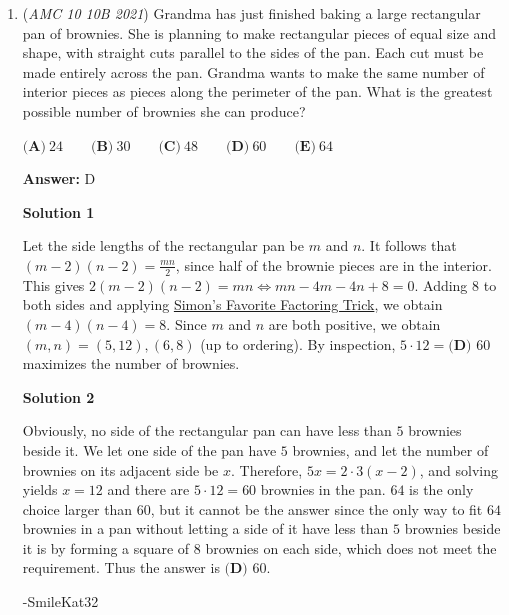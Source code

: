 \begin{enumerate}
 Therefore, the height is divided by $3$ and divided by $4$, which is $18 \div 3 \div 4 = \boxed{\textbf{(A)} ~1.5}.$



	\item (\textit{AMC 10 10B 2021}) Grandma has just finished baking a large rectangular pan of brownies. She is planning to make rectangular pieces of equal size and shape, with straight cuts parallel to the sides of the pan. Each cut must be made entirely across the pan. Grandma wants to make the same number of interior pieces as pieces along the perimeter of the pan. What is the greatest possible number of brownies she can produce?


 $\textbf{(A)} ~24 \qquad\textbf{(B)} ~30 \qquad\textbf{(C)} ~48 \qquad\textbf{(D)} ~60 \qquad\textbf{(E)} ~64$

 \textbf{Answer: }D



\textbf{Solution 1}

Let the side lengths of the rectangular pan be $m$ and $n$. It follows that $(m-2)(n-2) = \frac{mn}{2}$, since half of the brownie pieces are in the interior. This gives $2(m-2)(n-2) = mn \iff mn - 4m - 4n + 8 = 0$. Adding $8$ to both sides and applying \href{https://artofproblemsolving.com/wiki/index.php?title=Simon\%27s\_Favorite\_Factoring\_Trick}{Simon's Favorite Factoring Trick}, we obtain $(m-4)(n-4) = 8$. Since $m$ and $n$ are both positive, we obtain $(m, n) = (5, 12), (6, 8)$ (up to ordering). By inspection, $5 \cdot 12 = \boxed{\textbf{(D) }60}$ maximizes the number of brownies.

 



\textbf{Solution 2}

Obviously, no side of the rectangular pan can have less than $5$ brownies beside it. We let one side of the pan have $5$ brownies, and let the number of brownies on its adjacent side be $x$. Therefore, $5x=2\cdot3(x-2)$, and solving yields $x=12$ and there are $5\cdot12=60$ brownies in the pan. $64$ is the only choice larger than $60$, but it cannot be the answer since the only way to fit $64$ brownies in a pan without letting a side of it have less than $5$ brownies beside it is by forming a square of $8$ brownies on each side, which does not meet the requirement. Thus the answer is $\boxed{\textbf{(D) }60}$.

 -SmileKat32

 




\end{enumerate}
